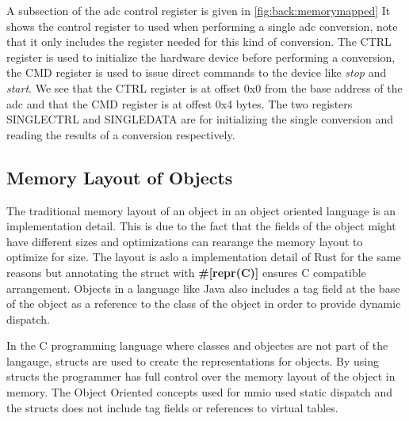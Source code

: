 A subsection of the \gls{adc} control register is given in \autoref{fig:back:memorymapped}
It shows the control register to used when performing a single \gls{adc} conversion, note that it only includes the register needed for this kind of conversion.
The CTRL register is used to initialize the hardware device before performing a conversion, the CMD register is used to issue direct commands to the device like \emph{stop} and \emph{start}.
We see that the CTRL register is at offset 0x0 from the base address of the \gls{adc} and that the CMD register is at offest 0x4 bytes.
The two registers SINGLECTRL and SINGLEDATA are for initializing the single conversion and reading the results of a conversion respectively.

\subsection{Memory Layout of Objects}

The traditional memory layout of an object in an object oriented language is an implementation detail.
This is due to the fact that the fields of the object might have different sizes and optimizations can rearange the memory layout to optimize for size.
The layout is aslo a implementation detail of Rust for the same reasons but annotating the struct with \textbf{#[repr(C)]} ensures C compatible arrangement.
Objects in a language like Java also includes a tag field at the base of the object as a reference to the class of the object in order to provide dynamic dispatch.

In the C programming language where classes and objectes are not part of the langauge, structs are used to create the representations for objects.
By using structs the programmer has full control over the memory layout of the object in memory.
The Object Oriented concepts used for \gls{mmio} used static dispatch and the structs does not include tag fields or references to virtual tables.

